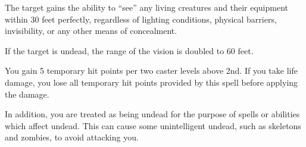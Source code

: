 \begin{spellheader}
    \begin{spelltargetinginfo}
    \end{spelltargetinginfo}
    \begin{spelleffects}
    \end{spelleffects}
\end{spellheader}
\begin{spellcontent}
    \spelleffect The target gains the ability to ``see'' any living creatures and their equipment within 30 feet perfectly, regardless of lighting conditions, physical barriers, invisibility, or any other means of concealment.

    If the target is undead, the range of the vision is doubled to 60 feet.
    \spelldur{\durlong \dismissable}
\end{spellcontent}
\begin{spellfooter}

\end{spellfooter}

\begin{spellheader}
    \begin{spelltargetinginfo}
    \end{spelltargetinginfo}
    \begin{spelleffects}
    \end{spelleffects}
\end{spellheader}
\begin{spellcontent}
    \spelleffect You gain 5 temporary hit points  per two caster levels above 2nd. If you take life damage, you lose all temporary hit points provided by this spell before applying the damage.

    In addition, you are treated as being undead for the purpose of spells or abilities which affect undead. This can cause some unintelligent undead, such as skeletons and zombies, to avoid attacking you.
    \spelldur{\durlong}
\end{spellcontent}
\begin{spellfooter}

\end{spellfooter}

